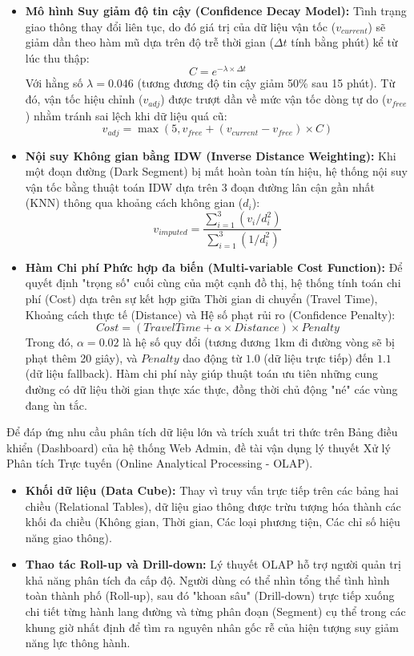 \begin{itemize}
    \item \textbf{Mô hình Suy giảm độ tin cậy (Confidence Decay Model):} Tình trạng giao thông thay đổi liên tục, do đó giá trị của dữ liệu vận tốc ($v_{current}$) sẽ giảm dần theo hàm mũ dựa trên độ trễ thời gian ($\Delta t$ tính bằng phút) kể từ lúc thu thập:
    $$C = e^{-\lambda \times \Delta t}$$
    Với hằng số $\lambda = 0.046$ (tương đương độ tin cậy giảm 50\% sau 15 phút). Từ đó, vận tốc hiệu chỉnh ($v_{adj}$) được trượt dần về mức vận tốc dòng tự do ($v_{free}$) nhằm tránh sai lệch khi dữ liệu quá cũ:
    $$v_{adj} = \max(5, v_{free} + (v_{current} - v_{free}) \times C)$$
    
    \item \textbf{Nội suy Không gian bằng IDW (Inverse Distance Weighting):} Khi một đoạn đường (Dark Segment) bị mất hoàn toàn tín hiệu, hệ thống nội suy vận tốc bằng thuật toán IDW dựa trên 3 đoạn đường lân cận gần nhất (KNN) thông qua khoảng cách không gian ($d_i$):
    $$v_{imputed} = \frac{\sum_{i=1}^{3} (v_i / d_i^2)}{\sum_{i=1}^{3} (1 / d_i^2)}$$
    
    \item \textbf{Hàm Chi phí Phức hợp đa biến (Multi-variable Cost Function):} Để quyết định "trọng số" cuối cùng của một cạnh đồ thị, hệ thống tính toán chi phí (Cost) dựa trên sự kết hợp giữa Thời gian di chuyển (Travel Time), Khoảng cách thực tế (Distance) và Hệ số phạt rủi ro (Confidence Penalty):
    $$Cost = (TravelTime + \alpha \times Distance) \times Penalty$$
    Trong đó, $\alpha = 0.02$ là hệ số quy đổi (tương đương 1km đi đường vòng sẽ bị phạt thêm 20 giây), và $Penalty$ dao động từ $1.0$ (dữ liệu trực tiếp) đến $1.1$ (dữ liệu fallback). Hàm chi phí này giúp thuật toán ưu tiên những cung đường có dữ liệu thời gian thực xác thực, đồng thời chủ động "né" các vùng đang ùn tắc.
\end{itemize}


Để đáp ứng nhu cầu phân tích dữ liệu lớn và trích xuất tri thức trên Bảng điều khiển (Dashboard) của hệ thống Web Admin, đề tài vận dụng lý thuyết Xử lý Phân tích Trực tuyến (Online Analytical Processing - OLAP).
\begin{itemize}
    \item \textbf{Khối dữ liệu (Data Cube):} Thay vì truy vấn trực tiếp trên các bảng hai chiều (Relational Tables), dữ liệu giao thông được trừu tượng hóa thành các khối đa chiều (Không gian, Thời gian, Các loại phương tiện, Các chỉ số hiệu năng giao thông).
    \item \textbf{Thao tác Roll-up và Drill-down:} Lý thuyết OLAP hỗ trợ người quản trị khả năng phân tích đa cấp độ. Người dùng có thể nhìn tổng thể tình hình toàn thành phố (Roll-up), sau đó "khoan sâu" (Drill-down) trực tiếp xuống chi tiết từng hành lang đường và từng phân đoạn (Segment) cụ thể trong các khung giờ nhất định để tìm ra nguyên nhân gốc rễ của hiện tượng suy giảm năng lực thông hành.
\end{itemize}

